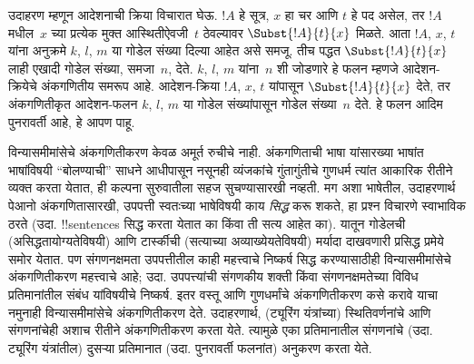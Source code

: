\documentclass[../../../include/open-logic-section]{subfiles}
\begin{document}
उदाहरण म्हणून आदेशनाची क्रिया विचारात घेऊ. $!A$ हे सूत्र, $x$ हा
चर आणि $t$ हे पद असेल, तर $!A$ मधील~$x$ च्या प्रत्येक मुक्त
आस्थितीऐवजी~$t$ ठेवल्यावर $\Subst{!A}{t}{x}$ मिळते. आता $!A$,
$x$, $t$ यांना अनुक्रमे $k$, $l$, $m$ या गोडेल संख्या दिल्या आहेत
असे समजू. तीच पद्धत $\Subst{!A}{t}{x}$ लाही एखादी गोडेल संख्या,
समजा~$n$, देते. $k$, $l$, $m$ यांना~$n$ शी जोडणारे हे फलन म्हणजे
आदेशन-क्रियेचे अंकगणितीय समरूप आहे. आदेशन-क्रिया $!A$, $x$, $t$
यांपासून $\Subst{!A}{t}{x}$ देते, तर अंकगणितीकृत आदेशन-फलन
$k$, $l$, $m$ या गोडेल संख्यांपासून गोडेल संख्या~$n$ देते.
हे फलन आदिम पुनरावर्ती आहे, हे आपण पाहू.

विन्यासमीमांसेचे अंकगणितीकरण केवळ अमूर्त रुचीचे नाही. अंकगणिताची
भाषा यांसारख्या भाषांत भाषांविषयी ``बोलण्याची'' साधने आधीपासून
नसूनही व्यंजकांचे गुंतागुंतीचे गुणधर्म त्यांत आकारिक रीतीने व्यक्त
करता येतात, ही कल्पना सुरुवातीला सहज सुचण्यासारखी नव्हती. मग
अशा भाषेतील, उदाहरणार्थ पेआनो अंकगणितासारखी, उपपत्ती स्वतःच्या
भाषेविषयी काय \emph{सिद्ध} करू शकते, हा प्रश्न विचारणे स्वाभाविक
ठरते (उदा. !!{sentence}s सिद्ध करता येतात का किंवा ती सत्य आहेत
का). यातून गोडेलची (असिद्धतायोग्यतेविषयी) आणि टार्स्कीची
(सत्याच्या अव्याख्येयतेविषयी) मर्यादा दाखवणारी प्रसिद्ध प्रमेये
समोर येतात. पण संगणनक्षमता उपपत्तीतील काही महत्त्वाचे निष्कर्ष
सिद्ध करण्यासाठीही विन्यासमीमांसेचे अंकगणितीकरण महत्त्वाचे आहे;
उदा. उपपत्त्यांची संगणकीय शक्ती किंवा संगणनक्षमतेच्या विविध
प्रतिमानांतील संबंध यांविषयीचे निष्कर्ष. इतर वस्तू आणि गुणधर्मांचे
अंकगणितीकरण कसे करावे याचा नमुनाही विन्यासमीमांसेचे अंकगणितीकरण
देते. उदाहरणार्थ, (ट्यूरिंग यंत्रांच्या) स्थितिवर्णनांचे आणि
संगणनांचेही अशाच रीतीने अंकगणितीकरण करता येते. त्यामुळे एका
प्रतिमानातील संगणनांचे (उदा. ट्यूरिंग यंत्रांतील) दुसऱ्या प्रतिमानात
(उदा. पुनरावर्ती फलनांत) अनुकरण करता येते.
\end{document}
